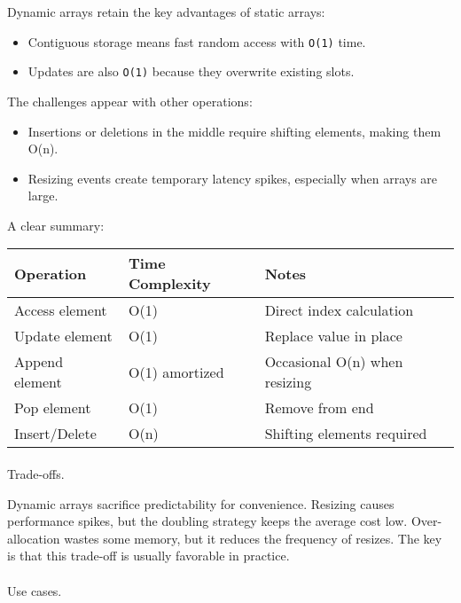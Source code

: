 \documentclass[
  letterpaper,
  DIV=11,
  numbers=noendperiod]{scrreprt}
\makeatletter
\let\oldparagraph\paragraph
\renewcommand{\paragraph}{
    \@ifstar
      \xxxParagraphStar
      \xxxParagraphNoStar
  }
\newcommand{\xxxParagraphStar}[1]{\oldparagraph*{#1}\mbox{}}
\newcommand{\xxxParagraphNoStar}[1]{\oldparagraph{#1}\mbox{}}
\providecommand{\tightlist}{%
  \setlength{\itemsep}{0pt}\setlength{\parskip}{0pt}}
\makeatother
\begin{document}
Dynamic arrays retain the key advantages of static arrays:

\begin{itemize}
\tightlist
\item
  Contiguous storage means fast random access with \texttt{O(1)} time.
\item
  Updates are also \texttt{O(1)} because they overwrite existing slots.
\end{itemize}

The challenges appear with other operations:

\begin{itemize}
\tightlist
\item
  Insertions or deletions in the middle require shifting elements,
  making them O(n).
\item
  Resizing events create temporary latency spikes, especially when
  arrays are large.
\end{itemize}

A clear summary:

\begin{longtable}[]{@{}lll@{}}
\toprule\noalign{}
Operation & Time Complexity & Notes \\
\midrule\noalign{}
\endhead
\bottomrule\noalign{}
\endlastfoot
Access element & O(1) & Direct index calculation \\
Update element & O(1) & Replace value in place \\
Append element & O(1) amortized & Occasional O(n) when resizing \\
Pop element & O(1) & Remove from end \\
Insert/Delete & O(n) & Shifting elements required \\
\end{longtable}

\paragraph{Trade-offs.}\label{trade-offs.-1}

Dynamic arrays sacrifice predictability for convenience. Resizing causes
performance spikes, but the doubling strategy keeps the average cost
low. Over-allocation wastes some memory, but it reduces the frequency of
resizes. The key is that this trade-off is usually favorable in
practice.

\paragraph{Use cases.}\label{use-cases.-1}
\end{document}
